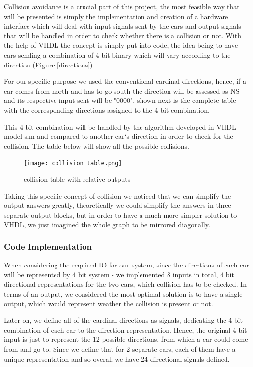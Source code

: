 \documentclass[conference]{IEEEtran}
\begin{document}
Collision avoidance is a crucial part of this project, the most feasible way that will be presented is simply the implementation and creation of a hardware interface which will deal with input signals sent by the cars and output signals that will be handled in order to check whether there is a collision or not. With the help of VHDL the concept is simply put into code, the idea being to have cars sending a combination of 4-bit binary which will vary according to the direction (Figure \ref{directions}).

For our specific purpose we used the conventional cardinal directions, hence, if a car comes from north and has to go south the direction will be assessed as NS and its respective input sent will be "0000", shown next is the complete table with the corresponding directions assigned to the 4-bit combination.

This 4-bit combination will be handled by the algorithm developed in VHDL model sim and compared to another car`s direction in order to check for the collision. The table below will show all the possible collisions.

\begin{figure}[h]
    \centerline{\texttt{[image: collision table.png]}}
    \caption{collision table with relative outputs}
    \label{table}
\end{figure}

Taking this specific concept of collision we noticed that we can simplify the output answers greatly, theoretically we could simplify the answers in three separate output blocks, but in order to have a much more simpler solution to VHDL, we just imagined the whole graph to be mirrored diagonally.


\subsubsection{Code Implementation}

When considering the required IO for our system, since the directions of each car will be represented by 4 bit system - we implemented 8 inputs in total, 4 bit directional representations for the two cars, which collision has to be checked. In terms of an output, we considered the most optimal solution is to have a single output, which would represent weather the collision is present or not.

Later on, we define all of the cardinal directions as signals, dedicating the 4 bit combination of each car to the direction representation. Hence, the original 4 bit input is just to represent the 12 possible directions, from which a car could come from and go to. Since we define that for 2 separate cars, each of them have a unique representation and so overall we have 24 directional signals defined.
\end{document}
